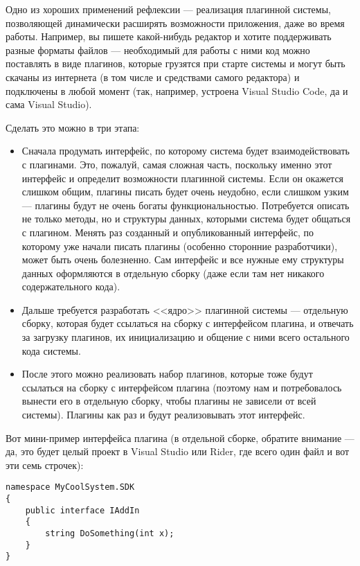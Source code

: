 \documentclass[a5paper]{article}
\begin{document}
Одно из хороших применений рефлексии --- реализация плагинной системы, позволяющей динамически расширять возможности приложения, даже во время работы. Например, вы пишете какой-нибудь редактор и хотите поддерживать разные форматы файлов --- необходимый для работы с ними код можно поставлять в виде плагинов, которые грузятся при старте системы и могут быть скачаны из интернета (в том числе и средствами самого редактора) и подключены в любой момент (так, например, устроена Visual Studio Code, да и сама Visual Studio). 

Сделать это можно в три этапа:
\begin{itemize}
    \item Сначала продумать интерфейс, по которому система будет взаимодействовать с плагинами. Это, пожалуй, самая сложная часть, поскольку именно этот интерфейс и определит возможности плагинной системы. Если он окажется слишком общим, плагины писать будет очень неудобно, если слишком узким --- плагины будут не очень богаты функциональностью. Потребуется описать не только методы, но и структуры данных, которыми система будет общаться с плагином. Менять раз созданный и опубликованный интерфейс, по которому уже начали писать плагины (особенно сторонние разработчики), может быть очень болезненно. Сам интерфейс и все нужные ему структуры данных оформляются в отдельную сборку (даже если там нет никакого содержательного кода).
    \item Дальше требуется разработать <<ядро>> плагинной системы --- отдельную сборку, которая будет ссылаться на сборку с интерфейсом плагина, и отвечать за загрузку плагинов, их инициализацию и общение с ними всего остального кода системы.
    \item После этого можно реализовать набор плагинов, которые тоже будут ссылаться на сборку с интерфейсом плагина (поэтому нам и потребовалось вынести его в отдельную сборку, чтобы плагины не зависели от всей системы). Плагины как раз и будут реализовывать этот интерфейс.
\end{itemize}

Вот мини-пример интерфейса плагина (в отдельной сборке, обратите внимание --- да, это будет целый проект в Visual Studio или Rider, где всего один файл и вот эти семь строчек):

\begin{verbatim}
namespace MyCoolSystem.SDK 
{
    public interface IAddIn 
    {
        string DoSomething(int x);
    }
}
\end{verbatim}
\end{document}

